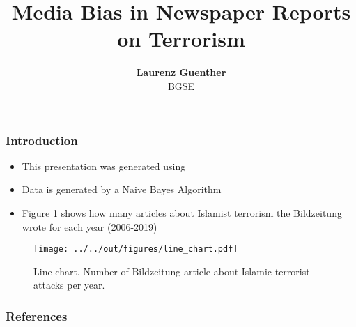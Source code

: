\documentclass[11pt]{beamer}
\begin{document}
	
	\title{Media Bias in Newspaper Reports on Terrorism}
	
	\author[Laurenz Guenther]
	{
		{\bf Laurenz Guenther}\\
		{\small BGSE}\\[1ex]
	}
	
	
	\begin{frame}
	\titlepage
	\note{~}
\end{frame}


\begin{frame}[t]
\frametitle{Introduction}
\begin{itemize}
	\item<+-> This presentation was generated using \citet{GaudeckerEconProjectTemplates}
	\item<+-> Data is generated by a Naive Bayes Algorithm
	\item Figure 1 shows how many articles about Islamist terrorism the Bildzeitung wrote for each year (2006-2019)
\end{itemize}
\note{~}
\end{frame}



\begin{frame}
	\begin{figure}
		\caption{Line-chart. Number of Bildzeitung article about Islamic terrorist attacks per year.}		
		\texttt{[image: ../../out/figures/line\_chart.pdf]}	
	\end{figure}
\end{frame}




 {
\begin{frame}
\frametitle{}
\end{frame}

}

\begin{frame}[allowframebreaks]
\frametitle{References}

\renewcommand{\bibfont}{\normalfont\footnotesize}
\printbibliography


\end{frame}
\end{document}
